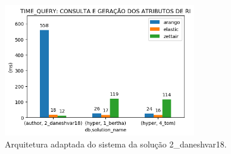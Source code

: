 \begin{figure}[h]
    \centering
    \caption{Arquitetura adaptada do sistema da solução 2\_daneshvar18.}
    \begin{center}
        \includegraphics[width=0.75\textwidth]{img/time-query.png}
    \end{center}
    \vspace{-0.5cm}
    \label{fig:2-daneshvar18-arquitetura-com-ri}
\end{figure}
